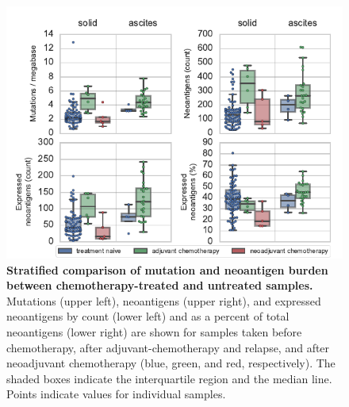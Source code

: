 \begin{figure}
\centering
\includegraphics[scale=1.0]{figures/counts.pdf}
\caption{\textbf{Stratified comparison of mutation and neoantigen burden between chemotherapy-treated and untreated samples.} Mutations (upper left), neoantigens (upper right), and expressed neoantigens by count (lower left) and as a percent of total neoantigens (lower right) are shown for samples taken before chemotherapy, after adjuvant-chemotherapy and relapse, and after neoadjuvant chemotherapy (blue, green, and red, respectively). The shaded boxes indicate the interquartile region and the median line. Points indicate values for individual samples.}
\label{fig:counts}
\end{figure}


